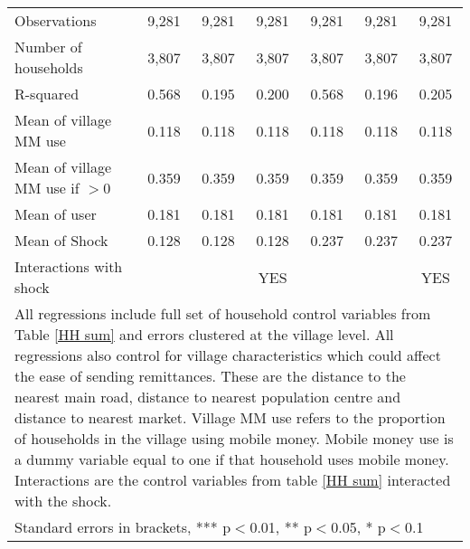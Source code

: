 \begin{table}
\begin{adjustwidth}{-1in}{-1in}
\begin{tabular}{lcccccc}
Observations & 9,281 & 9,281 & 9,281 & 9,281 & 9,281 & 9,281 \\
Number of households  & 3,807 & 3,807 & 3,807 & 3,807 & 3,807 & 3,807 \\
R-squared & 0.568 & 0.195 & 0.200 & 0.568 & 0.196 & 0.205 \\ \hline
Mean of village MM use  & 0.118 & 0.118 & 0.118 & 0.118 & 0.118 & 0.118 \\
Mean of village MM use if $>0$ & 0.359 & 0.359 & 0.359 & 0.359 & 0.359 & 0.359 \\
Mean of user & 0.181 & 0.181 & 0.181 & 0.181 & 0.181 & 0.181 \\
Mean of Shock & 0.128 & 0.128 & 0.128 & 0.237 & 0.237 & 0.237 \\
Interactions with shock &  &  & YES &  &  & YES \\ \hline
\multicolumn{7}{p{15cm}}{All regressions include full set of household control variables from Table \ref{HH sum} and errors clustered at the village level. All regressions also control for village characteristics which could affect the ease of sending remittances. These are the distance to the nearest main road, distance to nearest population centre and distance to nearest market. Village MM use refers to the proportion of households in the village using mobile money. Mobile money use is a dummy variable equal to one if that household uses mobile money. Interactions are the control variables from table \ref{HH sum} interacted with the shock.} \\
\multicolumn{7}{l}{ Standard errors in brackets, *** p$<$0.01, ** p$<$0.05, * p$<$0.1} 
\end{tabular}
 \end{adjustwidth}
 \end{table}
 
